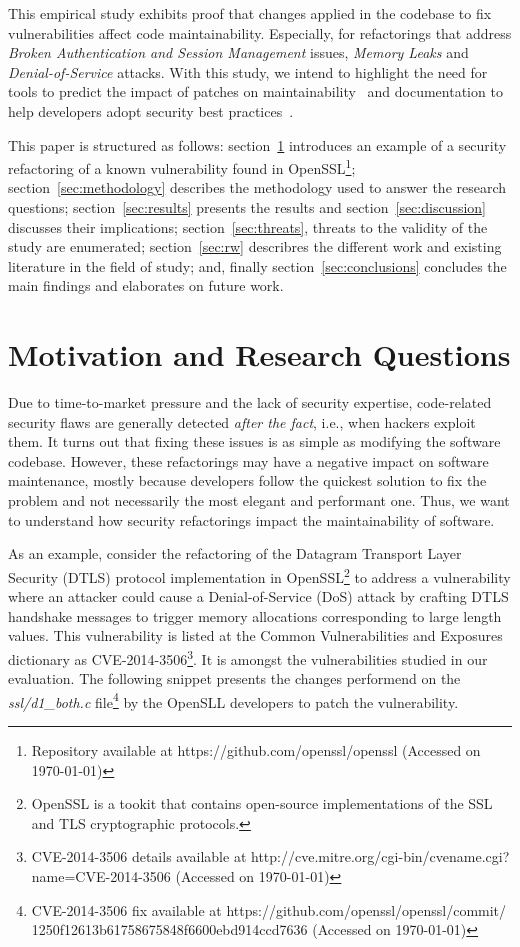 \documentclass[10pt,conference]{IEEEtran}
\begin{document}
This empirical study exhibits proof that changes applied in the codebase to fix
vulnerabilities affect code maintainability. Especially, for refactorings that
address \emph{Broken Authentication and Session Management} issues, \emph{Memory
Leaks} and \emph{Denial-of-Service} attacks. With this study, we intend to highlight the need for tools
to predict the impact of patches on maintainability~\cite{4724577} and documentation
to help developers adopt security best practices~\cite{6311252, 7927935, MESQUIDA201519}.

This paper is structured as follows: section~\ref{sec:motivation} introduces an
example of a security refactoring of a known vulnerability found in
OpenSSL\footnote{Repository available at https://github.com/openssl/openssl
(Accessed on \today{})}; section~\ref{sec:methodology} describes the
methodology used to answer the research questions; section~\ref{sec:results}
presents the results and section~\ref{sec:discussion} discusses their
implications; section~\ref{sec:threats}, threats to the validity of the study
are enumerated; section~\ref{sec:rw} describres the different work and existing
literature in the field of study; and, finally section~\ref{sec:conclusions}
concludes the main findings and elaborates on future work.
%
\section{Motivation and Research Questions}\label{sec:motivation}
%
Due to time-to-market pressure and the lack of security expertise, code-related
security flaws are generally detected \textit{after the fact}, i.e., when
hackers exploit them. It turns out that fixing these issues is as simple as
modifying the software codebase. However, these refactorings may have a negative
impact on software maintenance, mostly because developers follow the quickest
solution to fix the problem and not necessarily the most elegant and performant
one. Thus, we want to understand how security refactorings impact the
maintainability of software.

As an example, consider the refactoring of the Datagram Transport Layer Security
(DTLS) protocol implementation in OpenSSL\footnote{OpenSSL is a tookit that
contains open-source implementations of the SSL and TLS cryptographic
protocols.} to address a vulnerability where an attacker could cause a Denial-of-Service
(DoS) attack by crafting DTLS handshake messages to trigger memory allocations
corresponding to large length values. This vulnerability is listed at the Common
Vulnerabilities and Exposures dictionary as CVE-2014-3506\footnote{CVE-2014-3506
details available at http://cve.mitre.org/cgi-bin/cvename.cgi?name=CVE-2014-3506
(Accessed on \today{})}. It is amongst the vulnerabilities studied in our
evaluation. The following snippet presents the changes performend on the
\emph{ssl/d1\_both.c} file\footnote{CVE-2014-3506 fix available  at
https://github.com/openssl/openssl/commit/\\1250f12613b61758675848f6600ebd914ccd7636
(Accessed on \today{})} by the OpenSLL developers to patch the vulnerability.
\end{document}
